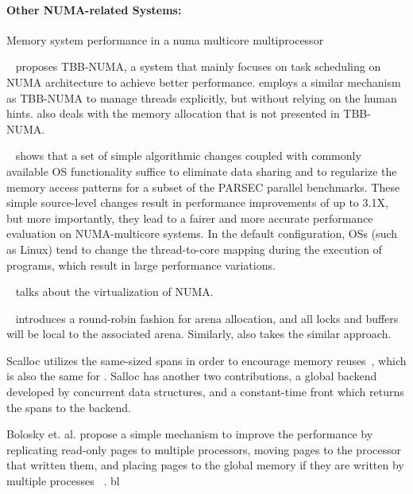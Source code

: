\paragraph{Other NUMA-related Systems:} 

Memory system performance in a numa multicore multiprocessor

~\cite{Majo:2015:LPC:2688500.2688509} proposes TBB-NUMA, a system that mainly focuses on task scheduling on NUMA architecture to achieve better performance. \NM{} employs a similar mechanism as TBB-NUMA to manage threads explicitly, but without relying on the human hints. \NM{} also deals with the memory allocation that is not presented in TBB-NUMA. 

~\cite{6704666} shows that a set of simple algorithmic changes coupled with commonly available OS functionality suffice to eliminate data sharing and to regularize the memory access patterns for a subset of the PARSEC parallel benchmarks. These simple source-level changes result in performance improvements of up to 3.1X, but more importantly, they lead to a fairer and more accurate performance evaluation on NUMA-multicore systems. In the default
configuration, OSs (such as Linux) tend to change the thread-to-core mapping during the execution of programs, which result in large performance variations.

~\cite{Bui:2019:EPV:3302424.3303960} talks about the virtualization of NUMA.

~\cite{jemalloc} introduces a round-robin fashion for arena allocation, and all locks and buffers will be local to the associated arena. Similarly, \NM{} also takes the similar approach. 

Scalloc utilizes the same-sized spans in order to encourage memory reuses~\cite{Scalloc}, which is also the same for \NM{}. Salloc has another two contributions, a global backend developed by concurrent data structures, and a constant-time front which returns the spans to the backend. 

Bolosky et. al. propose a simple mechanism to improve the performance by replicating read-only pages to multiple processors, moving pages to the processor that written them, and placing pages to the global memory if they are written by multiple processes ~\cite{Bolosky:1989:SBE:74850.74854}. bl

